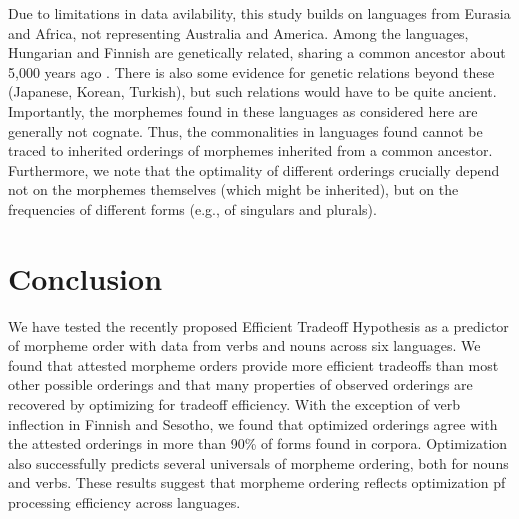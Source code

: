\documentclass[11pt,letterpaper]{article}
\newcommand{\citep}{\parencite}
\newcommand{\jd}[1]{\textcolor{Pink}{[jd: #1]}}
\begin{document}
Due to limitations in data avilability, this study builds on languages from Eurasia and Africa, not representing Australia and America.
Among the languages, Hungarian and Finnish are genetically related, sharing a common ancestor about 5,000 years ago \citep{maurits2020best}.
There is also some evidence for genetic relations beyond these (Japanese, Korean, Turkish), but such relations would have to be quite ancient.
Importantly, the morphemes found in these languages as considered here are generally not cognate.
Thus, the commonalities in languages found cannot be traced to inherited orderings of morphemes inherited from a common ancestor.
Furthermore, we note that the optimality of different orderings crucially depend not on the morphemes themselves (which might be inherited), but on the frequencies of different forms (e.g., of singulars and plurals).





\section{Conclusion}

We have tested the recently proposed Efficient Tradeoff Hypothesis as a predictor of morpheme order with data from verbs and nouns across six languages.
We found that attested morpheme orders provide more efficient tradeoffs than most other possible orderings and that many properties of observed orderings are recovered by optimizing for tradeoff efficiency.
With the exception of verb inflection in Finnish and Sesotho, we found that optimized orderings agree with the attested orderings in more than 90\% of forms found in corpora.
Optimization also successfully predicts several universals of morpheme ordering, both for nouns and verbs.
These results suggest that morpheme ordering reflects optimization pf processing efficiency across languages.


\printbibliography
\end{document}
